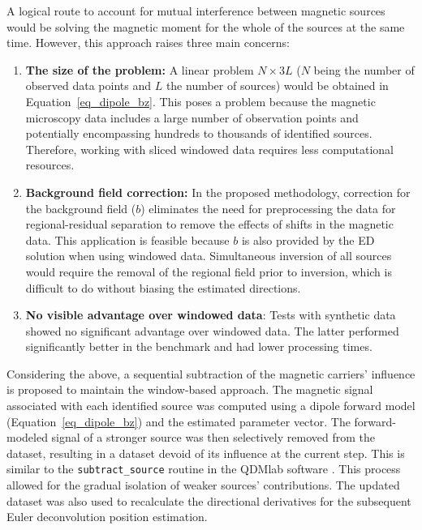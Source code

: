     A logical route to account for mutual interference between magnetic sources would be solving the magnetic moment for the whole of the sources at the same time. However, this approach raises three main concerns:

    \begin{enumerate}
        \item \textbf{The size of the problem:} A linear problem $N \times 3L$ ($N$ being the number of observed data points and $L$ the number of sources) would be obtained in Equation~\ref{eq_dipole_bz}. This poses a problem because the magnetic microscopy data includes a large number of observation points and potentially encompassing hundreds to thousands of identified sources. Therefore, working with sliced windowed data requires less computational resources.

        \item \textbf{Background field correction:} In the proposed methodology, correction for the background field ($b$) eliminates the need for preprocessing the data for regional-residual separation to remove the effects of shifts in the magnetic data. This application is feasible because $b$ is also provided by the ED solution when using windowed data. Simultaneous inversion of all sources would require the removal of the regional field prior to inversion, which is difficult to do without biasing the estimated directions.

        \item \textbf{No visible advantage over windowed data}: Tests with synthetic data \citep[see supplementary Jupyter notebooks in][]{figshare} showed no significant advantage over windowed data. The latter performed significantly better in the benchmark and had lower processing times.

    \end{enumerate}

    Considering the above, a sequential subtraction of the magnetic carriers' influence is proposed to maintain the window-based approach. The magnetic signal associated with each identified source was computed using a dipole forward model (Equation~\ref{eq_dipole_bz}) and the estimated parameter vector. The forward-modeled signal of a stronger source was then selectively removed from the dataset, resulting in a dataset devoid of its influence at the current step.
    This is similar to the \texttt{subtract\_source} routine in the QDMlab software \citep{Volk2022}. This process allowed for the gradual isolation of weaker sources' contributions. The updated dataset was also used to recalculate the directional derivatives for the subsequent Euler deconvolution position estimation.

